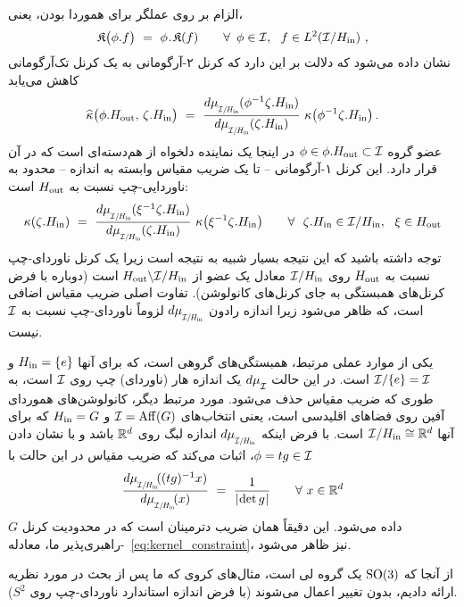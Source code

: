 الزام بر روی عملگر برای هموردا بودن، یعنی،
\begin{align}
	\mathfrak{K}\big( \phi.f \big)\ =\ \phi \mkern1mu.\mkern1.5mu \mathfrak{K}(f)
	\qquad \forall\,\ \phi\in\mathcal{I},\ \ f\in L^2(\mathcal{I}/H_{\textup{in}}) \ ,
\end{align}
نشان داده می‌شود که دلالت بر این دارد که کرنل ۲-آرگومانی به یک کرنل تک‌آرگومانی کاهش می‌یابد
\begin{align}
	\widehat{\kappa} \big(\phi.\Hout,\, \zeta.\Hin \big)
	\ =\ \frac{\dmuIHin(\phi^{-1} \zeta.\Hin)}{\dmuIHin(\zeta.\Hin)}\ \kappa\big(\phi^{-1} \zeta.\Hin \big) \,.
\end{align}
عضو گروه $\phi\in \phi.H_{\textup{out}} \subset \mathcal{I}$ در اینجا یک نماینده دلخواه از هم‌دسته‌ای است که در آن قرار دارد.
این کرنل ۱-آرگومانی -- تا یک ضریب مقیاس وابسته به اندازه -- محدود به ناوردایی-چپ نسبت به $H_{\textup{out}}$ است:
\begin{align}
	\kappa(\zeta.\Hin)\ =\ \frac{\dmuIHin(\xi^{-1} \zeta.\Hin)}{\dmuIHin(\zeta.\Hin)}\ \kappa\big(\xi^{-1} \zeta.\Hin \big)
	\qquad \forall\ \ \zeta.\Hin \in \I/\Hin,\ \ \xi\in\Hout
\end{align}
توجه داشته باشید که این نتیجه بسیار شبیه به نتیجه \citet{Kondor2018-GENERAL} است زیرا یک کرنل ناوردای-چپ نسبت به $H_{\textup{out}}$ روی $\mathcal{I}/H_{\textup{in}}$ معادل یک عضو از $H_{\textup{out}}\backslash \mathcal{I}/H_{\textup{in}}$ است (دوباره با فرض کرنل‌های همبستگی به جای کرنل‌های کانولوشن).
تفاوت اصلی ضریب مقیاس اضافی است، که ظاهر می‌شود زیرا اندازه رادون $\dmuIHin$ لزوماً ناوردای-چپ نسبت به $\mathcal{I}$ نیست.


یکی از موارد عملی مرتبط، همبستگی‌های گروهی است، که برای آنها $H_{\textup{in}} = \{e\}$ و $\mathcal{I}/\{e\} = \mathcal{I}$ است.
در این حالت $d\mu_{\overset{}{\mathcal{I}}}$ یک اندازه هار (ناوردای) چپ روی $\mathcal{I}$ است، به طوری که ضریب مقیاس حذف می‌شود.
مورد مرتبط دیگر، کانولوشن‌های هموردای آفين روی فضاهای اقلیدسی است، یعنی انتخاب‌های $\mathcal{I} = \operatorname{Aff}(G)$ و $H_{\textup{in}}=G$ که برای آنها $\mathcal{I}/H_{\textup{in}} \cong \mathbb{R}^d$ است.
با فرض اینکه $\dmuIHin$ اندازه لبگ روی $\mathbb{R}^d$ باشد و با نشان دادن $\phi=tg \in \mathcal{I}$، \citet{bekkers2020bspline} اثبات می‌کند که ضریب مقیاس در این حالت با
\begin{align}
	\frac{\dmuIHin\!( (tg)^{-1}x )}{\dmuIHin\!(x)}\ =\ \frac{1}{\detg} \qquad \forall\ x\in\R^d
\end{align}
داده می‌شود. این دقیقاً همان ضریب دترمینان است که در محدودیت کرنل $G$-راهبری‌پذیر ما، معادله~\eqref{eq:kernel_constraint}، نیز ظاهر می‌شود.


از آنجا که $\operatorname{SO}(3)$ یک گروه لی است، مثال‌های  کروی که ما پس از بحث در مورد نظریه \citet{Kondor2018-GENERAL} ارائه دادیم، بدون تغییر اعمال می‌شوند (با فرض اندازه استاندارد ناوردای-چپ روی $S^2$).


